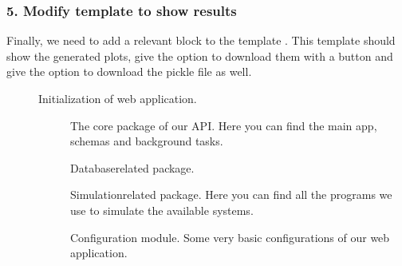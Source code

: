 \documentclass[a4paper,landscape,10pt,english]{sphinxmanual}
\begin{document}
\subsubsection{5. Modify  template to show results}
\label{\detokenize{code_docs/new_simulation:modify-results-html-template-to-show-results}}
Finally, we need to add a relevant  block to the template
. This template should show the
generated plots, give the option to download them with a button and
give the option to download the pickle file as well.
\begin{description}
\item[{{\hyperref[\detokenize{code_docs/simulation_API:module-simulation_API}]{}}}] \leavevmode
Initialization of web application.
\begin{description}
\item[{{\hyperref[\detokenize{code_docs/simulation_API.controller:module-simulation_API.controller}]{}}}] \leavevmode
The core package of our API. Here you can find the main app, schemas and
background tasks.

\item[{{\hyperref[\detokenize{code_docs/simulation_API.model:module-simulation_API.model}]{}}}] \leavevmode
Database\sphinxhyphen{}related package.

\item[{{\hyperref[\detokenize{code_docs/simulation_API.simulation:module-simulation_API.simulation}]{}}}] \leavevmode
Simulation\sphinxhyphen{}related package. Here you can find all the programs we use to
simulate the available systems.

\item[{{\hyperref[\detokenize{code_docs/simulation_API.config:module-simulation_API.config}]{}}}] \leavevmode
Configuration module. Some very basic configurations of our web application.

\end{description}

\end{description}
\end{document}
